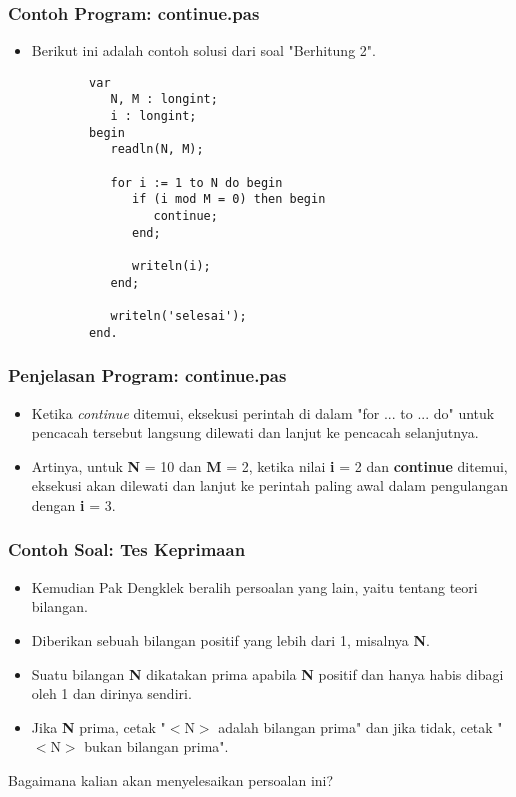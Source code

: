 \documentclass{beamer}
\begin{document}
\begin{frame}[fragile]
\frametitle{Contoh Program: continue.pas}
\begin{itemize}
    \item Berikut ini adalah contoh solusi dari soal "Berhitung 2".
    \begin{lstlisting}
        var
           N, M : longint;
           i : longint;
        begin
           readln(N, M);

           for i := 1 to N do begin
              if (i mod M = 0) then begin
                 continue;
              end;

              writeln(i);
           end;

           writeln('selesai');
        end.
    \end{lstlisting}
\end{itemize}
\end{frame}

\begin{frame}
\frametitle{Penjelasan Program: continue.pas}
\begin{itemize}
    \item Ketika \textit{continue} ditemui, eksekusi perintah di dalam "for ... to ... do" untuk pencacah tersebut langsung dilewati dan lanjut ke pencacah selanjutnya.
    \item Artinya, untuk \textbf{N} = 10 dan \textbf{M} = 2, ketika nilai \textbf{i} = 2 dan \textbf{continue} ditemui, eksekusi akan dilewati dan lanjut ke perintah paling awal dalam pengulangan dengan \textbf{i} = 3.
\end{itemize}
\end{frame}


\begin{frame}
\frametitle{Contoh Soal: Tes Keprimaan}
\begin{itemize}
    \item Kemudian Pak Dengklek beralih persoalan yang lain, yaitu tentang teori bilangan.
    \item Diberikan sebuah bilangan positif yang lebih dari 1, misalnya \textbf{N}.
    \item Suatu bilangan \textbf{N} dikatakan prima apabila \textbf{N} positif dan hanya habis dibagi oleh 1 dan dirinya sendiri.
    \item Jika \textbf{N} prima, cetak "$<$N$>$ adalah bilangan prima" dan jika tidak, cetak "$<$N$>$ bukan bilangan prima".
\end{itemize}
Bagaimana kalian akan menyelesaikan persoalan ini?
\end{frame}
\end{document}
